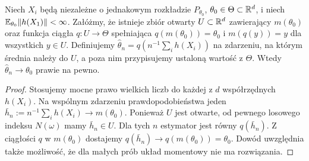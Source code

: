 \begin{twierdzenie}
\label{thm:mom-consistency}
Niech $X_i$ będą niezależne o jednakowym rozkładzie $P_{\theta_0}$,
$\theta_0\in\Theta\subset\mathbb R^d$, i niech $\mathbb E_{\theta_0}\|h(X_1)\|<\infty$.
Załóżmy, że istnieje zbiór otwarty $U\subset\mathbb R^d$ zawierający
$m(\theta_0)$ oraz funkcja ciągła $q:U\to\Theta$ spełniająca
$q(m(\theta_0))=\theta_0$ i $m(q(y))=y$ dla wszystkich $y\in U$.
Definiujemy $\widehat\theta_n=q(n^{-1}\sum_i h(X_i))$ na zdarzeniu,
na którym średnia należy do $U$, a poza nim przypisujemy ustaloną
wartość z $\Theta$. Wtedy $\widehat\theta_n\to\theta_0$ prawie na pewno.
\end{twierdzenie}
\begin{proof}
Stosujemy mocne prawo wielkich liczb do każdej z $d$ współrzędnych
$h(X_i)$. Na wspólnym zdarzeniu prawdopodobieństwa jeden
$\bar h_n:=n^{-1}\sum_i h(X_i)\to m(\theta_0)$.
Ponieważ $U$ jest otwarte, od pewnego losowego indeksu $N(\omega)$
mamy $\bar h_n\in U$. Dla tych $n$ estymator jest równy
$q(\bar h_n)$. Z ciągłości $q$ w $m(\theta_0)$ dostajemy
$q(\bar h_n)\to q(m(\theta_0))=\theta_0$. Dowód uwzględnia
także możliwość, że dla małych prób układ momentowy nie ma rozwiązania.
\end{proof}


